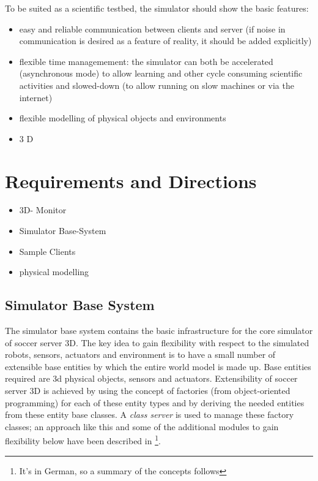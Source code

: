 \documentclass[a4paper,12pt]{article}
\begin{document}
To be suited as a scientific testbed, the simulator should show the basic features:

\begin{itemize}
\item easy and reliable communication between clients and server (if
  noise in communication is desired as a feature of reality, it should
  be added explicitly)
\item flexible time managemement: the simulator can both be
  accelerated (asynchronous mode) to allow learning and other cycle
  consuming scientific activities and slowed-down (to allow running on
  slow machines or via the internet)
\item flexible modelling of physical objects and environments
\item 3 D
\end{itemize}

\section{Requirements and Directions}

\begin{itemize}
\item 3D- Monitor
\item Simulator Base-System
\item Sample Clients
\item physical modelling
\end{itemize}


\subsection{Simulator Base System}
\label{sec:sbs}

The simulator base system contains the basic infrastructure for the
core simulator of soccer server 3D. The key idea to gain flexibility
with respect to the simulated robots, sensors, actuators and
environment is to have a small number of extensible base entities by
which the entire world model is made up. Base entities required are 3d
physical objects, sensors and actuators. Extensibility of soccer server
3D is achieved by using the
concept of factories (from object-oriented programming) for each of
these entity types and by deriving the needed entities from these
entity base classes. A \emph{class server} is used to manage these
factory classes; an approach like this and some of the additional
modules to gain flexibility below have been described in
\cite{ABF+02}\footnote{It's in German, so a summary of the concepts
  follows}.
\end{document}

